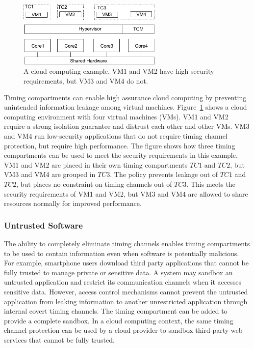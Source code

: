 \begin{figure}
    \begin{center}
        \includegraphics[width=2.79in]{figs/cloud_tcs.pdf}
        \caption{A cloud computing example. VM1 and VM2 have high security 
        requirements, but VM3 and VM4 do not.}
        \label{fig:cloud_tcs}
    \end{center}
\end{figure}

Timing compartments can enable high assurance cloud computing by preventing
unintended information leakage among virtual machines.
Figure~\ref{fig:cloud_tcs} shows a cloud computing environment with four virtual 
machines (VMs).
VM1 and VM2 require a strong isolation guarantee and distrust each other and 
other VMs.
VM3 and VM4 run low-security applications that do not require timing channel 
protection, but require high performance. The figure shows how three timing 
compartments can be used to meet the security requirements in this example.
VM1 and VM2 are placed in their own timing compartments $TC1$ and $TC2$, but VM3 
and VM4 are grouped in $TC3$. The policy prevents leakage out of $TC1$ and 
$TC2$, but places no constraint on timing channels out of $TC3$. This meets the 
security requirements of VM1 and VM2, but VM3 and VM4 are allowed to share 
resources normally for improved performance.


\subsubsection{Untrusted Software} 

The ability to completely eliminate timing channels enables timing compartments
to be used to contain information even when software is potentially malicious.
For example, smartphone users download third party applications
that cannot be fully trusted to manage private or sensitive data. A system may
sandbox an untrusted application and restrict its communication channels
when it accesses sensitive data. However, access control mechanisms cannot
prevent the untrusted application from leaking information to another 
unrestricted
application through internal covert timing channels. The timing compartment can 
be added to provide a complete sandbox.  In a cloud computing
context, the same timing channel protection can be used
by a cloud provider to sandbox third-party web services that cannot be fully 
trusted.

